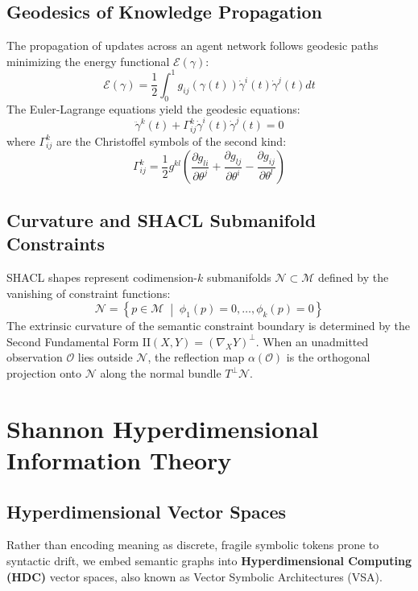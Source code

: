 \documentclass[12pt,oneside,a4paper]{book}
\theoremstyle{definition}
\theoremstyle{plain}
\theoremstyle{remark}
\begin{document}
\section{Geodesics of Knowledge Propagation}
The propagation of updates across an agent network follows geodesic paths minimizing the energy functional $\mathcal{E}(\gamma)$:
\begin{equation}
    \mathcal{E}(\gamma) = \frac{1}{2} \int_0^1 g_{ij}(\gamma(t)) \dot{\gamma}^i(t) \dot{\gamma}^j(t) dt
\end{equation}
The Euler-Lagrange equations yield the geodesic equations:
\begin{equation}
    \ddot{\gamma}^k(t) + \Gamma^k_{ij} \dot{\gamma}^i(t) \dot{\gamma}^j(t) = 0
\end{equation}
where $\Gamma^k_{ij}$ are the Christoffel symbols of the second kind:
\begin{equation}
    \Gamma^k_{ij} = \frac{1}{2} g^{kl} \left( \frac{\partial g_{li}}{\partial \theta^j} + \frac{\partial g_{lj}}{\partial \theta^i} - \frac{\partial g_{ij}}{\partial \theta^l} \right)
\end{equation}

\section{Curvature and SHACL Submanifold Constraints}
SHACL shapes represent codimension-$k$ submanifolds $\mathcal{N} \subset \mathcal{M}$ defined by the vanishing of constraint functions:
\begin{equation}
    \mathcal{N} = \left\{ p \in \mathcal{M} \;\middle|\; \phi_1(p) = 0, \dots, \phi_k(p) = 0 \right\}
\end{equation}
The extrinsic curvature of the semantic constraint boundary is determined by the Second Fundamental Form $\mathrm{II}(X, Y) = (\nabla_X Y)^\perp$. When an unadmitted observation $\mathcal{O}$ lies outside $\mathcal{N}$, the reflection map $\alpha(\mathcal{O})$ is the orthogonal projection onto $\mathcal{N}$ along the normal bundle $T^\perp \mathcal{N}$.

\chapter{Shannon Hyperdimensional Information Theory}

\section{Hyperdimensional Vector Spaces}
Rather than encoding meaning as discrete, fragile symbolic tokens prone to syntactic drift, we embed semantic graphs into \textbf{Hyperdimensional Computing (HDC)} vector spaces, also known as Vector Symbolic Architectures (VSA).
\end{document}
